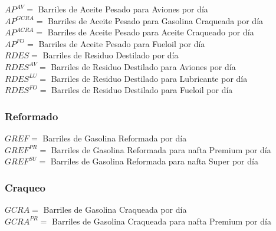 \documentclass[a4paper,10pt]{article}
\begin{document}
$AP^{AV} = $ Barriles de Aceite Pesado para Aviones por d\'ia \\

$AP^{GCRA} = $ Barriles de Aceite Pesado para Gasolina Craqueada  por d\'ia \\

$AP^{ACRA} = $ Barriles de Aceite Pesado para Aceite Craqueado por d\'ia \\

$AP^{FO} = $ Barriles de Aceite Pesado para Fueloil por d\'ia \\

$RDES = $ Barriles de Residuo Destilado por d\'ia \\

$RDES^{AV} = $ Barriles de Residuo Destilado para Aviones por d\'ia \\

$RDES^{LU} = $ Barriles de Residuo Destilado para Lubricante por d\'ia \\

$RDES^{FO} = $ Barriles de Residuo Destilado para Fueloil por d\'ia \\
\vspace{2mm}

\subsubsection{Reformado}
\vspace{5mm}

$GREF = $ Barriles de Gasolina Reformada por d\'ia \\

$GREF^{PR} = $ Barriles de Gasolina Reformada para nafta Premium por d\'ia \\

$GREF^{SU} = $ Barriles de Gasolina Reformada para nafta Super por d\'ia \\
\vspace{2mm}

\subsubsection{Craqueo}
\vspace{5mm}

$GCRA = $ Barriles de Gasolina Craqueada por d\'ia \\

$GCRA^{PR} = $ Barriles de Gasolina Craqueada para nafta Premium por d\'ia \\
\end{document}
